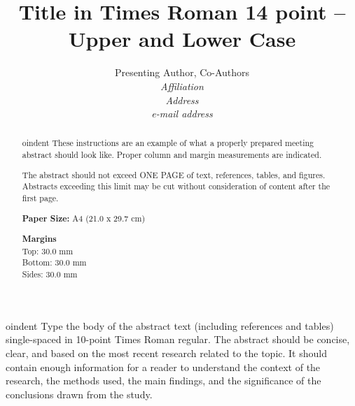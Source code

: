 \documentclass[10pt,a4paper]{article}
\title{Title in Times Roman 14 point – Upper and Lower Case}
\author{Presenting Author, Co-Authors\\
\textit{Affiliation}\\
\textit{Address}\\
\textit{e-mail address}}
\date{} %
\begin{document}
\maketitle

\begin{abstract}

oindent These instructions are an example of what a properly prepared meeting abstract should look like. Proper column and margin measurements are indicated.

The abstract should not exceed ONE PAGE of text, references, tables, and figures. Abstracts exceeding this limit may be cut without consideration of content after the first page.

\textbf{Paper Size:} A4 (21.0 x 29.7 cm)

\textbf{Margins} \\
Top: 30.0 mm \\
Bottom: 30.0 mm \\
Sides: 30.0 mm
\end{abstract}


oindent Type the body of the abstract text (including references and tables) single-spaced in 10-point Times Roman regular. The abstract should be concise, clear, and based on the most recent research related to the topic. It should contain enough information for a reader to understand the context of the research, the methods used, the main findings, and the significance of the conclusions drawn from the study.
\end{document}
